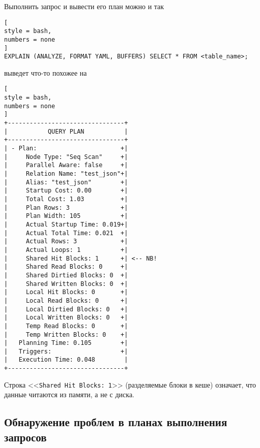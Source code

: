\documentclass[%
	11pt,
	a4paper,
	utf8,
		]{article}
\begin{document}
Выполнить запрос и вывести его план можно и так
\begin{lstlisting}[
style = bash,
numbers = none
]
EXPLAIN (ANALYZE, FORMAT YAML, BUFFERS) SELECT * FROM <table_name>;
\end{lstlisting}

выведет что-то похожее на
\begin{lstlisting}[
style = bash,
numbers = none
]
+--------------------------------+
|           QUERY PLAN           |
+--------------------------------+
| - Plan:                       +|
|     Node Type: "Seq Scan"     +|
|     Parallel Aware: false     +|
|     Relation Name: "test_json"+|
|     Alias: "test_json"        +|
|     Startup Cost: 0.00        +|
|     Total Cost: 1.03          +|
|     Plan Rows: 3              +|
|     Plan Width: 105           +|
|     Actual Startup Time: 0.019+|
|     Actual Total Time: 0.021  +|
|     Actual Rows: 3            +|
|     Actual Loops: 1           +|
|     Shared Hit Blocks: 1      +| <-- NB!
|     Shared Read Blocks: 0     +|
|     Shared Dirtied Blocks: 0  +|
|     Shared Written Blocks: 0  +|
|     Local Hit Blocks: 0       +|
|     Local Read Blocks: 0      +|
|     Local Dirtied Blocks: 0   +|
|     Local Written Blocks: 0   +|
|     Temp Read Blocks: 0       +|
|     Temp Written Blocks: 0    +|
|   Planning Time: 0.105        +|
|   Triggers:                   +|
|   Execution Time: 0.048        |
+--------------------------------+
\end{lstlisting}

Строка <<\texttt{Shared Hit Blocks: 1}>> (разделяемые блоки в кеше) означает, что данные читаются из памяти, а не с диска.

\subsection{Обнаружение проблем в планах выполнения запросов}
\end{document}
